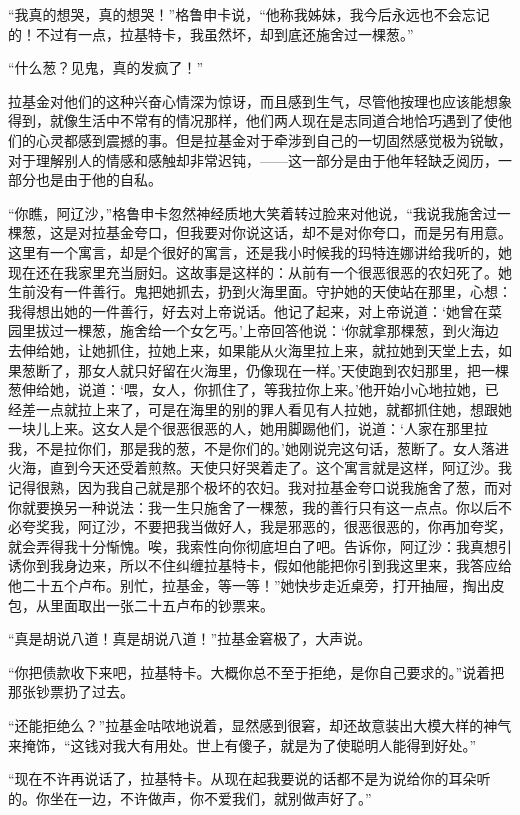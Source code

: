 \par “我真的想哭，真的想哭！”格鲁申卡说，“他称我姊妹，我今后永远也不会忘记的！不过有一点，拉基特卡，我虽然坏，却到底还施舍过一棵葱。”
\par “什么葱？见鬼，真的发疯了！”
\par 拉基金对他们的这种兴奋心情深为惊讶，而且感到生气，尽管他按理也应该能想象得到，就像生活中不常有的情况那样，他们两人现在是志同道合地恰巧遇到了使他们的心灵都感到震撼的事。但是拉基金对于牵涉到自己的一切固然感觉极为锐敏，对于理解别人的情感和感触却非常迟钝，——这一部分是由于他年轻缺乏阅历，一部分也是由于他的自私。
\par “你瞧，阿辽沙，”格鲁申卡忽然神经质地大笑着转过脸来对他说，“我说我施舍过一棵葱，这是对拉基金夸口，但我要对你说这话，却不是对你夸口，而是另有用意。这里有一个寓言，却是个很好的寓言，还是我小时候我的玛特连娜讲给我听的，她现在还在我家里充当厨妇。这故事是这样的：从前有一个很恶很恶的农妇死了。她生前没有一件善行。鬼把她抓去，扔到火海里面。守护她的天使站在那里，心想：我得想出她的一件善行，好去对上帝说话。他记了起来，对上帝说道：‘她曾在菜园里拔过一棵葱，施舍给一个女乞丐。’上帝回答他说：‘你就拿那棵葱，到火海边去伸给她，让她抓住，拉她上来，如果能从火海里拉上来，就拉她到天堂上去，如果葱断了，那女人就只好留在火海里，仍像现在一样。’天使跑到农妇那里，把一棵葱伸给她，说道：‘喂，女人，你抓住了，等我拉你上来。’他开始小心地拉她，已经差一点就拉上来了，可是在海里的别的罪人看见有人拉她，就都抓住她，想跟她一块儿上来。这女人是个很恶很恶的人，她用脚踢他们，说道：‘人家在那里拉我，不是拉你们，那是我的葱，不是你们的。’她刚说完这句话，葱断了。女人落进火海，直到今天还受着煎熬。天使只好哭着走了。这个寓言就是这样，阿辽沙。我记得很熟，因为我自己就是那个极坏的农妇。我对拉基金夸口说我施舍了葱，而对你就要换另一种说法：我一生只施舍了一棵葱，我的善行只有这一点点。你以后不必夸奖我，阿辽沙，不要把我当做好人，我是邪恶的，很恶很恶的，你再加夸奖，就会弄得我十分惭愧。唉，我索性向你彻底坦白了吧。告诉你，阿辽沙：我真想引诱你到我身边来，所以不住纠缠拉基特卡，假如他能把你引到我这里来，我答应给他二十五个卢布。别忙，拉基金，等一等！”她快步走近桌旁，打开抽屉，掏出皮包，从里面取出一张二十五卢布的钞票来。
\par “真是胡说八道！真是胡说八道！”拉基金窘极了，大声说。
\par “你把债款收下来吧，拉基特卡。大概你总不至于拒绝，是你自己要求的。”说着把那张钞票扔了过去。
\par “还能拒绝么？”拉基金咕哝地说着，显然感到很窘，却还故意装出大模大样的神气来掩饰，“这钱对我大有用处。世上有傻子，就是为了使聪明人能得到好处。”
\par “现在不许再说话了，拉基特卡。从现在起我要说的话都不是为说给你的耳朵听的。你坐在一边，不许做声，你不爱我们，就别做声好了。”
